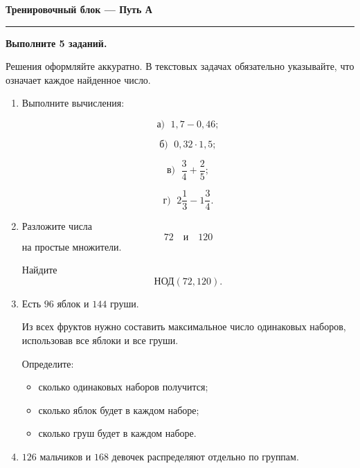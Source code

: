 \documentclass[a4paper,12pt]{article}
\newcommand{\sectiontitle}[1]{%
    \vspace{0.4em}
    {\Large\bfseries\textcolor{darkaccent}{#1}}\par
    \vspace{0.2em}
    \noindent
    \textcolor{accent}{\rule{\linewidth}{0.7pt}}\par
    \vspace{0.35em}
}
\begin{document}

\sectiontitle{Тренировочный блок --- Путь А}

\textbf{Выполните 5 заданий.}

Решения оформляйте аккуратно.
В текстовых задачах обязательно указывайте,
что означает каждое найденное число.

\begin{enumerate}


\item
Выполните вычисления:

\[
\text{а) }\;
1{,}7-0{,}46;
\]

\[
\text{б) }\;
0{,}32\cdot1{,}5;
\]

\[
\text{в) }\;
\frac34+\frac25;
\]

\[
\text{г) }\;
2\frac13-1\frac34.
\]


\item
Разложите числа
\[
72
\quad\text{и}\quad
120
\]
на простые множители.

Найдите
\[
\text{НОД}(72,120).
\]


\item
Есть $96$ яблок и $144$ груши.

Из всех фруктов нужно составить
максимальное число одинаковых наборов,
использовав все яблоки и все груши.

Определите:

\begin{itemize}

\item
сколько одинаковых наборов получится;

\item
сколько яблок будет в каждом наборе;

\item
сколько груш будет в каждом наборе.

\end{itemize}


\item
$126$ мальчиков и $168$ девочек
распределяют отдельно по группам.


\end{enumerate}
\end{document}
